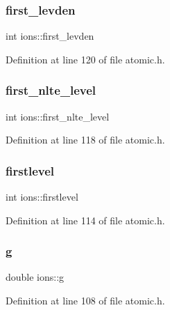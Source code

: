 \mbox{\label{structions_ae85a5d5e56e8f31e011e3a03baa2ef32}} 
\subsubsection{\texorpdfstring{first\+\_\+levden}{first\_levden}}
{\footnotesize\ttfamily int ions\+::first\+\_\+levden}



Definition at line 120 of file atomic.\+h.

\mbox{\label{structions_a83472c99234de6ca9d530d69b71e3d04}} 
\subsubsection{\texorpdfstring{first\+\_\+nlte\+\_\+level}{first\_nlte\_level}}
{\footnotesize\ttfamily int ions\+::first\+\_\+nlte\+\_\+level}



Definition at line 118 of file atomic.\+h.

\mbox{\label{structions_a587f7b3375cf15bf273583f42be7816b}} 
\subsubsection{\texorpdfstring{firstlevel}{firstlevel}}
{\footnotesize\ttfamily int ions\+::firstlevel}



Definition at line 114 of file atomic.\+h.

\mbox{\label{structions_a57bcd07f6852176e85629314a1e8a057}} 
\subsubsection{\texorpdfstring{g}{g}}
{\footnotesize\ttfamily double ions\+::g}



Definition at line 108 of file atomic.\+h.

